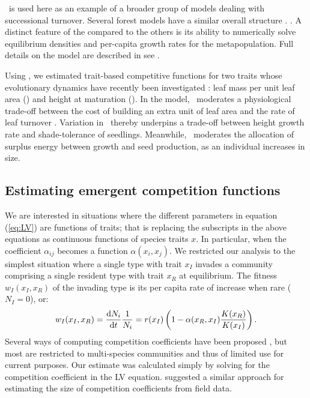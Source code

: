 \documentclass[a4paper,11pt]{article}
\newcommand{\verify}[1]{{\color{navy}{(verify: #1)}}}
\newcommand{\todo}[1]{{\color{navy}{(todo: #1)}}}
\begin{document}
\plant\ is used here as an example of a broader group of models dealing with successional turnover. Several forest models have a similar overall structure \citep{Huston-1987,Kohyama-1993,Moorcroft-2001}. \todo{add refs to LJP Guess, ED2}. A distinct feature of the \plant compared to the others is its ability to numerically solve equilibrium densities and per-capita growth rates for the metapopulation. Full details on the model are described in see \citet{Falster-2016, Falster-2017}.

Using \plant, we estimated trait-based competitive functions for two traits whose evolutionary dynamics have recently been investigated \citep{Falster-2017}: leaf mass per unit leaf area (\lma) and height at maturation (\hmat). In the model, \lma\ moderates a physiological trade-off between the cost of building an extra unit of leaf area and the rate of leaf turnover \citep{Wright-2004}. Variation in \lma\ thereby underpins a trade-off between height growth rate and shade-tolerance of seedlings. Meanwhile, \hmat\ moderates the allocation of surplus energy between growth and seed production, as an individual increases in size.

\verify{Do we want to add any equations for the plant model? E.g. for basic fitness calculations?}

\subsection{Estimating emergent competition functions}

We are interested in situations where the different parameters in equation (\ref{eq:LV}) are functions of traits; that is replacing the subscripts in the above equations as continuous functions of species traits $x$. In particular, when the coefficient $\alpha_{ij}$ becomes a function $\alpha(x_i, x_j)$. We restricted our analysis to the simplest situation where a single type with trait $x_I$ invades a community comprising a single resident type with trait $x_R$ at equilibrium. The fitness $w_I(x_I, x_R)$ of the invading type is its per capita rate of increase when rare ($N_I = 0$), or: 
\begin{equation}\label{eq:LVi}
  w_I(x_I, x_R) = \frac{\mathrm{d} N_i}{\mathrm{d} t} \frac{1}{N_i} =
    r(x_I)\left(1 - \alpha(x_R, x_I) \frac{K(x_R)}{K(x_I)}\right).
\end{equation}
Several ways of computing competition coefficients have been proposed \citep[e.g.,][]{Abrams-1987,Abrams-2008}, but most are restricted to multi-species communities and thus of limited use for current purposes. Our estimate was calculated simply by solving for the competition coefficient in the LV equation. \citet{Ricklefs-1973} suggested a similar approach for estimating the size of competition coefficients from field data. 
\end{document}
